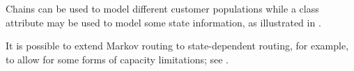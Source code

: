 Chains can be used to model different customer
populations while a class attribute may be used
to model some state information, as illustrated
in .

\begin{figure}[htbp]
\end{figure}

It is possible to extend Markov routing to state-dependent
routing, for example, to allow for some forms of capacity
limitations; see .

%
%
%
